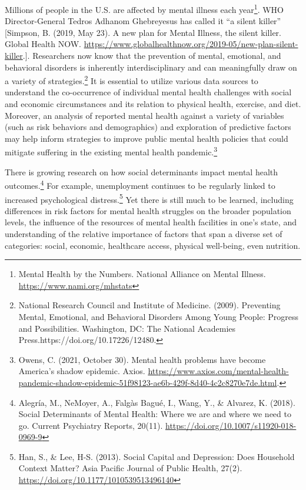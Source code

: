 \documentclass[
]{article}
\begin{document}
Millions of people in the U.S. are affected by mental illness each year\footnote{Mental Health by the Numbers. National Alliance on Mental Illness. \url{https://www.nami.org/mhstats}}. WHO Director-General Tedros Adhanom Ghebreyesus has called it ``a silent killer'' {[}Simpson, B. (2019, May 23). A new plan for Mental Illness, the silent killer. Global Health NOW. \url{https://www.globalhealthnow.org/2019-05/new-plan-silent-killer}.{]}. Researchers now know that the prevention of mental, emotional, and behavioral disorders is inherently interdisciplinary and can meaningfully draw on a variety of strategies.\footnote{National Research Council and Institute of Medicine. (2009). Preventing Mental, Emotional, and Behavioral Disorders Among Young People: Progress and Possibilities. Washington, DC: The National Academies Press.https://doi.org/10.17226/12480.} It is essential to utilize various data sources to understand the co-occurrence of individual mental health challenges with social and economic circumstances and its relation to physical health, exercise, and diet. Moreover, an analysis of reported mental health against a variety of variables (such as risk behaviors and demographics) and exploration of predictive factors may help inform strategies to improve public mental health policies that could mitigate suffering in the existing mental health pandemic.\footnote{Owens, C. (2021, October 30). Mental health problems have become America's shadow epidemic. Axios. \url{https://www.axios.com/mental-health-pandemic-shadow-epidemic-51f98123-ae6b-429f-8d40-4c2c8270e7de.html}.}

There is growing research on how social determinants impact mental health outcomes.\footnote{Alegría, M., NeMoyer, A., Falgàs Bagué, I., Wang, Y., \& Alvarez, K. (2018). Social Determinants of Mental Health: Where we are and where we need to go. Current Psychiatry Reports, 20(11). \url{https://doi.org/10.1007/s11920-018-0969-9}} For example, unemployment continues to be regularly linked to increased psychological distress.\footnote{Han, S., \& Lee, H-S. (2013). Social Capital and Depression: Does Household Context Matter? Asia Pacific Journal of Public Health, 27(2). \url{https://doi.org/10.1177/1010539513496140}} Yet there is still much to be learned, including differences in risk factors for mental health struggles on the broader population levels, the influence of the resources of mental health facilities in one's state, and understanding of the relative importance of factors that span a diverse set of categories: social, economic, healthcare access, physical well-being, even nutrition.
\end{document}
